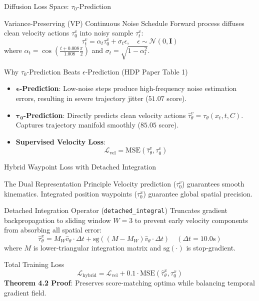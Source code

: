 \documentclass[t]{beamer}
\begin{document}
\begin{frame}{Diffusion Loss Space: $\tau_0$-Prediction}
    \begin{block}{Variance-Preserving (VP) Continuous Noise Schedule}
        Forward process diffuses clean velocity actions $\tau_0^v$ into noisy sample $\tau_t^v$:
        $$\tau_t^v = \alpha_t \tau_0^v + \sigma_t \epsilon, \quad \epsilon \sim \mathcal{N}(0, \mathbf{I})$$
        where $\alpha_t = \cos\left(\frac{t + 0.008}{1.008} \frac{\pi}{2}\right)$ and $\sigma_t = \sqrt{1 - \alpha_t^2}$.
    \end{block}

    \begin{alertblock}{Why $\tau_0$-Prediction Beats $\epsilon$-Prediction (HDP Paper Table 1)}
        \begin{itemize}
            \item $\boldsymbol{\epsilon}$\textbf{-Prediction}: Low-noise steps produce high-frequency noise estimation errors, resulting in severe trajectory jitter ($51.07$ score).
            \item $\mathbf{\tau_0}$\textbf{-Prediction}: Directly predicts clean velocity actions $\hat{\tau}_\theta^v = \tau_\theta(x_t, t, C)$. Captures trajectory manifold smoothly ($85.05$ score).
            \item \textbf{Supervised Velocity Loss}:
              $$\mathcal{L}_{\mathrm{vel}} = \mathrm{MSE}(\hat{\tau}_\theta^v, \tau_0^v)$$
        \end{itemize}
    \end{alertblock}
\end{frame}

\begin{frame}{Hybrid Waypoint Loss with Detached Integration}
    \begin{block}{The Dual Representation Principle}
        Velocity prediction ($\tau_0^v$) guarantees smooth kinematics. Integrated position waypoints ($\tau_0^x$) guarantee global spatial precision.
    \end{block}

    \begin{block}{Detached Integration Operator (\texttt{detached\_integral})}
        Truncates gradient backpropagation to sliding window $W=3$ to prevent early velocity components from absorbing all spatial error:
        $$\hat{\tau}_\theta^x = M_W \hat{v}_\theta \cdot \Delta t + \mathrm{sg}\left((M - M_W)\hat{v}_\theta \cdot \Delta t\right) \quad (\Delta t = 10.0\text{s})$$
        where $M$ is lower-triangular integration matrix and $\mathrm{sg}(\cdot)$ is stop-gradient.
    \end{block}

    \begin{block}{Total Training Loss}
        $$\mathcal{L}_{\mathrm{hybrid}} = \mathcal{L}_{\mathrm{vel}} + 0.1 \cdot \mathrm{MSE}(\hat{\tau}_\theta^x, \tau_0^x)$$
        \textbf{Theorem 4.2 Proof}: Preserves score-matching optima while balancing temporal gradient field.
    \end{block}
\end{frame}
\end{document}
